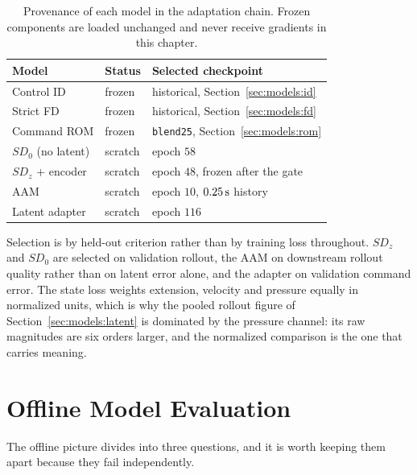 \begin{table}[tb]
  \centering
  \caption{Provenance of each model in the adaptation chain. Frozen components
  are loaded unchanged and never receive gradients in this chapter.}
  \label{tab:models:frozen}
  \small
  \begin{tabular}{lll}
    \toprule
    Model & Status & Selected checkpoint \\
    \midrule
    Control ID            & frozen  & historical, Section~\ref{sec:models:id} \\
    Strict FD             & frozen  & historical, Section~\ref{sec:models:fd} \\
    Command ROM           & frozen  & \texttt{blend25}, Section~\ref{sec:models:rom} \\
    $SD_0$ (no latent)    & scratch & epoch $58$ \\
    $SD_z$ + encoder      & scratch & epoch $48$, frozen after the gate \\
    AAM                   & scratch & epoch $10$, $\unit[0.25]{s}$ history \\
    Latent adapter        & scratch & epoch $116$ \\
    \bottomrule
  \end{tabular}
\end{table}

Selection is by held-out criterion rather than by training loss throughout.
$SD_z$ and $SD_0$ are selected on validation rollout, the AAM on downstream
rollout quality rather than on latent error alone, and the adapter on
validation command error. The state loss weights extension, velocity and
pressure equally in normalized units, which is why the pooled rollout figure of
Section~\ref{sec:models:latent} is dominated by the pressure channel: its raw
magnitudes are six orders larger, and the normalized comparison is the one that
carries meaning.


\section{Offline Model Evaluation}
\label{sec:models:offline-eval}
The offline picture divides into three questions, and it is worth keeping them
apart because they fail independently.

